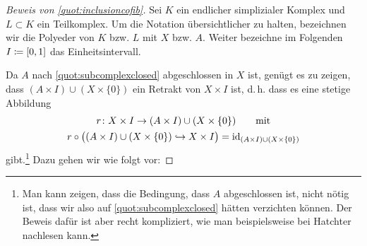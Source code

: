 %

\medskip
\begin{proof}[Beweis von \cref{quot:inclusioncofib}]
    Sei $K$ ein endlicher simplizialer Komplex und $L\subset K$ ein
    Teilkomplex. Um die Notation übersichtlicher zu halten, bezeichnen wir die
    Polyeder von $K$ bzw. $L$ mit $X$ bzw. $A$. Weiter bezeichne im Folgenden
    $I\coloneqq[0,1]$ das Einheitsintervall.

    Da $A$ nach \cref{quot:subcomplexclosed} abgeschlossen in $X$ ist, genügt es
    zu zeigen, dass $(A\times I)\cup(X\times\{0\})$ ein Retrakt von $X\times I$
    ist, d.\,h. dass es eine stetige Abbildung
    \begin{gather*}
        r\colon X\times I \to (A\times I)\cup(X\times\{0\}) 
        \qquad\text{mit} 
        \\ 
        r \circ \bigl( (A\times I)\cup(X\times\{0\}) \hookrightarrow
        X\times I \bigr) = \operatorname{id}_{(A\times I)\cup(X\times\{0\})}
    \end{gather*}
    gibt.\footnote{%
        Man kann zeigen, dass die Bedingung, dass $A$ abgeschlossen ist, nicht
        nötig ist, dass wir also auf \cref{quot:subcomplexclosed} hätten
        verzichten können. Der Beweis dafür ist aber recht kompliziert, wie man
        beispielsweise bei Hatchter\cite[Appendix,\,A.18]{bookc:hatcher02}
        nachlesen kann.%
    }
    Dazu gehen wir wie folgt vor:


\end{proof}
